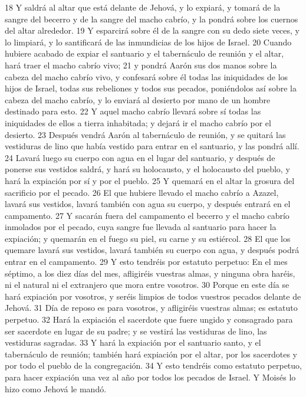 18 Y saldrá al altar que está delante de Jehová, y lo expiará, y tomará de la sangre del becerro y de la sangre del macho cabrío, y la pondrá sobre los cuernos del altar alrededor.
19 Y esparcirá sobre él de la sangre con su dedo siete veces, y lo limpiará, y lo santificará de las inmundicias de los hijos de Israel.
20 Cuando hubiere acabado de expiar el santuario y el tabernáculo de reunión y el altar, hará traer el macho cabrío vivo;
21 y pondrá Aarón sus dos manos sobre la cabeza del macho cabrío vivo, y confesará sobre él todas las iniquidades de los hijos de Israel, todas sus rebeliones y todos sus pecados, poniéndolos así sobre la cabeza del macho cabrío, y lo enviará al desierto por mano de un hombre destinado para esto.
22 Y aquel macho cabrío llevará sobre sí todas las iniquidades de ellos a tierra inhabitada; y dejará ir el macho cabrío por el desierto.
23 Después vendrá Aarón al tabernáculo de reunión, y se quitará las vestiduras de lino que había vestido para entrar en el santuario, y las pondrá allí.
24 Lavará luego su cuerpo con agua en el lugar del santuario, y después de ponerse sus vestidos saldrá, y hará su holocausto, y el holocausto del pueblo, y hará la expiación por sí y por el pueblo.
25 Y quemará en el altar la grosura del sacrificio por el pecado.
26 El que hubiere llevado el macho cabrío a Azazel, lavará sus vestidos, lavará también con agua su cuerpo, y después entrará en el campamento.
27 Y sacarán fuera del campamento el becerro y el macho cabrío inmolados por el pecado, cuya sangre fue llevada al santuario para hacer la expiación; y quemarán en el fuego su piel, su carne y su estiércol.
28 El que los quemare lavará sus vestidos, lavará también su cuerpo con agua, y después podrá entrar en el campamento.
29 Y esto tendréis por estatuto perpetuo: En el mes séptimo, a los diez días del mes, afligiréis vuestras almas, y ninguna obra haréis, ni el natural ni el extranjero que mora entre vosotros.
30 Porque en este día se hará expiación por vosotros, y seréis limpios de todos vuestros pecados delante de Jehová.
31 Día de reposo es para vosotros, y afligiréis vuestras almas; es estatuto perpetuo.
32 Hará la expiación el sacerdote que fuere ungido y consagrado para ser sacerdote en lugar de su padre; y se vestirá las vestiduras de lino, las vestiduras sagradas.
33 Y hará la expiación por el santuario santo, y el tabernáculo de reunión; también hará expiación por el altar, por los sacerdotes y por todo el pueblo de la congregación.
34 Y esto tendréis como estatuto perpetuo, para hacer expiación una vez al año por todos los pecados de Israel. Y Moisés lo hizo como Jehová le mandó.  

